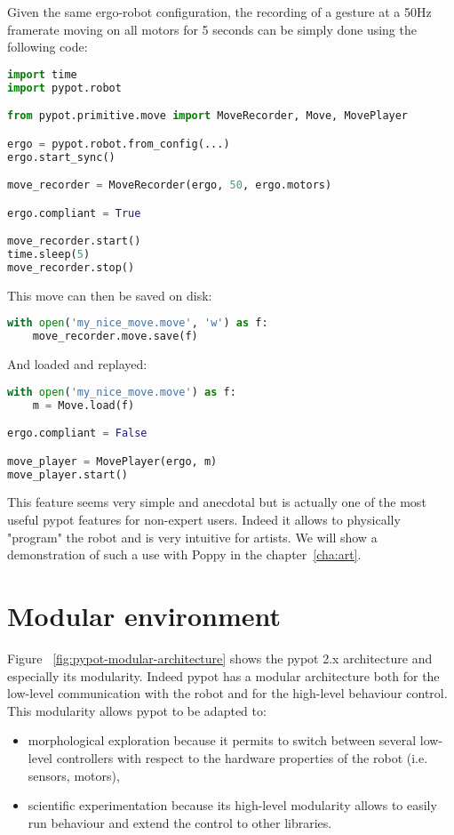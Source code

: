 Given the same ergo-robot configuration, the recording of a gesture at a 50Hz framerate moving on all motors for 5 seconds can be simply done using the following code:

\begin{lstlisting}[language = Python]
import time
import pypot.robot

from pypot.primitive.move import MoveRecorder, Move, MovePlayer

ergo = pypot.robot.from_config(...)
ergo.start_sync()

move_recorder = MoveRecorder(ergo, 50, ergo.motors)

ergo.compliant = True

move_recorder.start()
time.sleep(5)
move_recorder.stop()
\end{lstlisting}

This move can then be saved on disk:
\begin{lstlisting}[language = Python]
with open('my_nice_move.move', 'w') as f:
    move_recorder.move.save(f)
\end{lstlisting}

And loaded and replayed:
\begin{lstlisting}[language = Python]
with open('my_nice_move.move') as f:
    m = Move.load(f)

ergo.compliant = False

move_player = MovePlayer(ergo, m)
move_player.start()
\end{lstlisting}

This feature seems very simple and anecdotal but is actually one of the most useful pypot features for non-expert users. Indeed it allows to physically "program" the robot and is very intuitive for artists. We will show a demonstration of such a use with Poppy in the chapter~\ref{cha:art}.



\section{Modular environment} %

Figure \figurename~\ref{fig:pypot-modular-architecture} shows the pypot 2.x architecture and especially its modularity. Indeed pypot has a modular architecture both for the low-level communication with the robot and for the high-level behaviour control. This modularity allows pypot to be adapted to:

\begin{itemize}
    \item morphological exploration because it permits to switch between several low-level controllers with respect to the hardware properties of the robot (i.e. sensors, motors),
    \item scientific experimentation because its high-level modularity allows to easily run behaviour and extend the control to other libraries.
\end{itemize}

